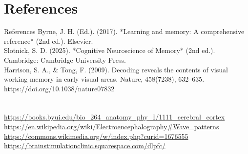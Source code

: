 \documentclass{beamer}
\begin{document}
\section{References}
\begin{frame}{References}
  Byrne, J. H. (Ed.). (2017). *Learning and memory: A comprehensive reference* (2nd ed.). Elsevier.\\
  Slotnick, S. D. (2025). *Cognitive Neuroscience of Memory* (2nd ed.). Cambridge: Cambridge University Press.\\
  Harrison, S. A., \& Tong, F. (2009). Decoding reveals the contents of visual working memory in early visual areas. Nature, 458(7238), 632–635. https://doi.org/10.1038/nature07832\\~\\~\\


  \url{https://books.byui.edu/bio\_264\_anatomy\_phy\_I/1111\_cerebral\_cortex}\\
  \url{https://en.wikipedia.org/wiki/Electroencephalography#Wave\_patterns}\\
  \url{https://commons.wikimedia.org/w/index.php?curid=1676555}\\
  \url{https://brainstimulationclinic.squarespace.com/dlpfc/}



\end{frame}
\end{document}
